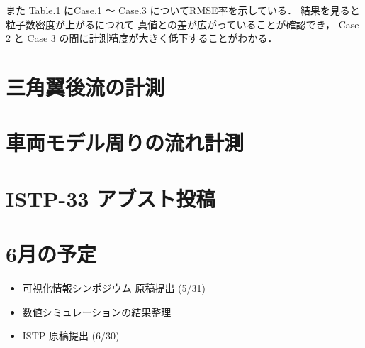 \documentclass[twocolumn,a4j]{jsarticle}
\begin{document}
また Table.1 にCase.1 ～ Case.3 についてRMSE率を示している．
結果を見ると粒子数密度が上がるにつれて
真値との差が広がっていることが確認でき，
Case 2 と Case 3 の間に計測精度が大きく低下することがわかる．

\section{三角翼後流の計測}

\section{車両モデル周りの流れ計測}

\newpage

\section{ISTP-33 アブスト投稿}

\section{6月の予定}
\begin{itemize}
  \item 可視化情報シンポジウム 原稿提出 (5/31)
  \item 数値シミュレーションの結果整理
  \item ISTP 原稿提出 (6/30)
\end{itemize}
\end{document}

